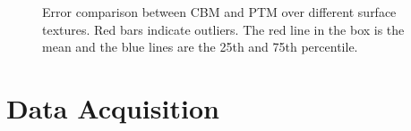 \begin{figure}[t]
\centering
{}
\caption{Error comparison between CBM and PTM over
different surface textures. Red bars indicate outliers. The red line in the box
is the mean and the blue lines are the 25th and 75th percentile.}
\end{figure}



\section{Data Acquisition}

